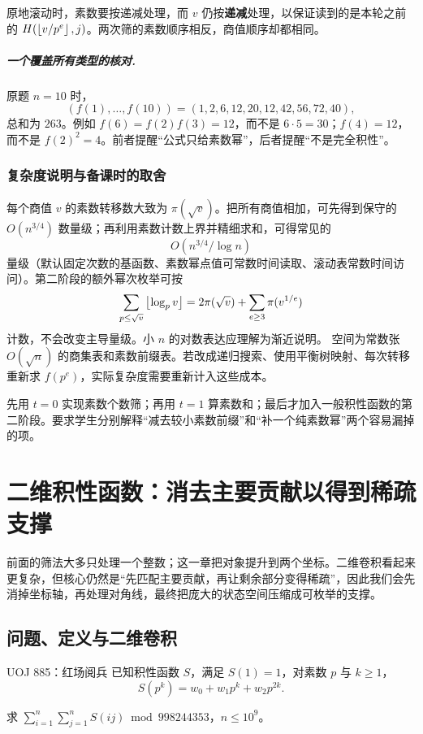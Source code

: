 原地滚动时，素数要按递减处理，而 $v$ 仍按\textbf{递减}处理，以保证读到的是本轮之前的 $H(\left\lfloor v/p^e\right\rfloor,j)$。两次筛的素数顺序相反，商值顺序却都相同。

\paragraph{一个覆盖所有类型的核对.}
原题 $n=10$ 时，
\[
(f(1),\ldots,f(10))=(1,2,6,12,20,12,42,56,72,40),
\]
总和为 $263$。例如 $f(6)=f(2)f(3)=12$，而不是 $6\cdot5=30$；$f(4)=12$，而不是 $f(2)^2=4$。前者提醒“公式只给素数幂”，后者提醒“不是完全积性”。

\subsection{复杂度说明与备课时的取舍}
每个商值 $v$ 的素数转移数大致为 $\pi(\sqrt v)$。把所有商值相加，可先得到保守的 $O(n^{3/4})$ 数量级；再利用素数计数上界并精细求和，可得常见的
\[
 O(n^{3/4}/\log n)
\]
量级（默认固定次数的基函数、素数幂点值可常数时间读取、滚动表常数时间访问）。第二阶段的额外幂次枚举可按
\[
 \sum_{p\le\sqrt v}\left\lfloor \log_p v\right\rfloor
 =2\pi(\sqrt v)+\sum_{e\ge3}\pi(v^{1/e})
\]
计数，不会改变主导量级。小 $n$ 的对数表达应理解为渐近说明。
空间为常数张 $O(\sqrt n)$ 的商集表和素数前缀表。若改成递归搜索、使用平衡树映射、每次转移重新求 $f(p^e)$，实际复杂度需要重新计入这些成本。

\begin{teach}[不要在第一次课就背完整转移]
先用 $t=0$ 实现素数个数筛；再用 $t=1$ 算素数和；最后才加入一般积性函数的第二阶段。要求学生分别解释“减去较小素数前缀”和“补一个纯素数幂”两个容易漏掉的项。
\end{teach}



\chapter{二维积性函数：消去主要贡献以得到稀疏支撑}
\begin{chapterintro}[章节导读]
前面的筛法大多只处理一个整数；这一章把对象提升到两个坐标。二维卷积看起来更复杂，但核心仍然是“先匹配主要贡献，再让剩余部分变得稀疏”，因此我们会先消掉坐标轴，再处理对角线，最终把庞大的状态空间压缩成可枚举的支撑。
\end{chapterintro}

\section{问题、定义与二维卷积}
\begin{problem}{UOJ 885：红场阅兵}
已知积性函数 $S$，满足 $S(1)=1$，对素数 $p$ 与 $k\ge1$，
\[
 S(p^k)=w_0+w_1p^k+w_2p^{2k}.
\]


求 $\sum_{i=1}^n\sum_{j=1}^nS(ij)\bmod998244353$，$n\le10^9$。
\end{problem}

